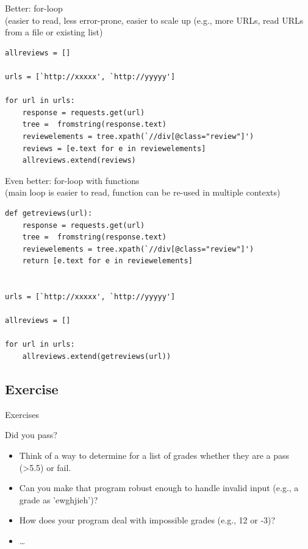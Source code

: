 \documentclass[handout]{beamer}
\begin{document}
\begin{frame}
Better: for-loop\\ (easier to read, less error-prone, easier to scale up (e.g., more URLs, read URLs from a file or existing list)
\begin{lstlisting}
allreviews = []

urls = [`http://xxxxx', `http://yyyyy']

for url in urls:
    response = requests.get(url)
    tree =  fromstring(response.text)
    reviewelements = tree.xpath(`//div[@class="review"]')
    reviews = [e.text for e in reviewelements]
    allreviews.extend(reviews)
\end{lstlisting}
\end{frame}


\begin{frame}
Even better: for-loop with functions\\ (main loop is easier to read, function can be re-used in multiple contexts)
\begin{lstlisting}
def getreviews(url):
    response = requests.get(url)
    tree =  fromstring(response.text)
    reviewelements = tree.xpath(`//div[@class="review"]')
    return [e.text for e in reviewelements]


urls = [`http://xxxxx', `http://yyyyy']

allreviews = []

for url in urls:
    allreviews.extend(getreviews(url))
\end{lstlisting}
\end{frame}

\subsection{Exercise}
\begin{frame}{Exercises}
\begin{block}{Did you pass?}
	\begin{itemize}
		\item Think of a way to determine for a list of  grades whether they are a pass (>5.5) or fail.
		\item Can you make that program robust enough to handle invalid input (e.g., a grade as 'ewghjieh')?
		\item How does your program deal with impossible grades (e.g., 12 or -3)?
		\item \ldots
	\end{itemize}
\end{block}
\end{frame}
\end{document}
